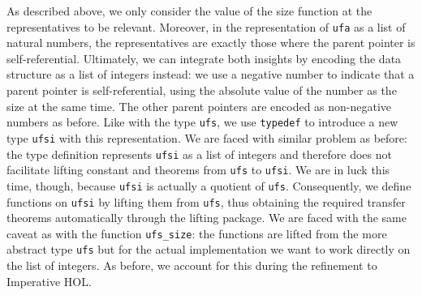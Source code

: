 \documentclass[
  sigplan,
  10pt,
  anonymous,
  review,
  ]{acmart}
\begin{document}
As described above, we only consider the value of the size function at the representatives to be relevant.
Moreover, in the representation of \lstinline|ufa| as a list of natural numbers, the representatives are exactly those where the parent pointer is self-referential.
Ultimately, we can integrate both insights by encoding the data structure as a list of integers instead:
we use a negative number to indicate that a parent pointer is self-referential, using the absolute value of the number as the size at the same time.
The other parent pointers are encoded as non-negative numbers as before.
Like with the type \lstinline|ufs|, we use \lstinline|typedef| to introduce a new type \lstinline|ufsi| with this representation.
We are faced with similar problem as before:
the type definition represents \lstinline|ufsi| as a list of integers and therefore does not facilitate lifting constant and theorems from \lstinline|ufs| to \lstinline|ufsi|.
We are in luck this time, though, because \lstinline|ufsi| is actually a quotient of \lstinline|ufs|.
Consequently, we define functions on \lstinline|ufsi| by lifting them from \lstinline|ufs|, thus obtaining the required transfer theorems automatically through the lifting package.
We are faced with the same caveat as with the function \lstinline|ufs_size|:
the functions are lifted from the more abstract type \lstinline|ufs| but for the actual implementation we want to work directly on the list of integers.
As before, we account for this during the refinement to Imperative HOL.
%
%
%
%
\end{document}
